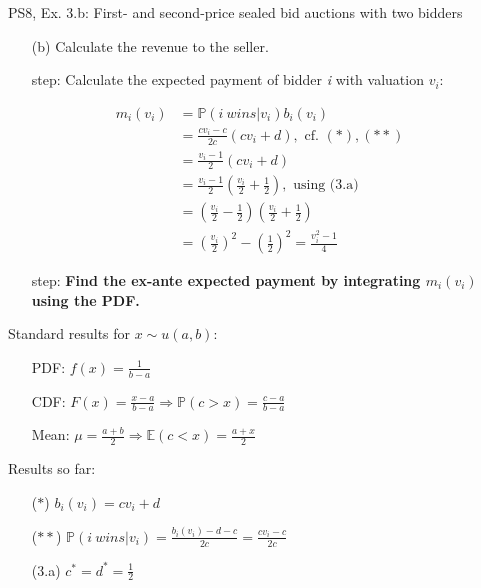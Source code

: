 \begin{frame}{PS8, Ex. 3.b: First- and second-price sealed bid auctions with two bidders}
    \begin{multicols}{2}
      \begin{itemize}
        \item[(b)] Calculate the revenue to the seller.
        \item[\nth{1} step:] Calculate the expected payment of bidder \textit{i} with valuation $v_i$:
      \end{itemize}
      \vspace{-6pt}
      \begin{align*}
        m_i(v_i)&=\mathbb{P}(i\ wins|v_i)b_i(v_i)\\
                &=\frac{cv_i-c}{2c}(cv_i+d),\text{ cf. }(*),(**)\\
                &=\frac{v_i-1}{2}(cv_i+d)\\
                &=\frac{v_i-1}{2}\left(\frac{v_i}{2}+\frac{1}{2}\right),\text{ using (3.a)}\\
                &=\left(\frac{v_i}{2}-\frac{1}{2}\right)\left(\frac{v_i}{2}+\frac{1}{2}\right)\\
                &=\left(\frac{v_i}{2}\right)^2-\left(\frac{1}{2}\right)^2
                 =\frac{v_i^2-1}{4}
      \end{align*}
      \vspace{-12pt}
      \begin{itemize}
        \item[\nth{2} step:] \textbf{Find the ex-ante expected payment by integrating $m_i(v_i)$ using the PDF.}
      \end{itemize}
      \vfill\null\columnbreak
      Standard results for $x\sim u(a, b):$
      \vspace{-6pt}
      \begin{enumerate}
        \item[PDF:] $f(x)=\frac{1}{b-a}$
        \item[CDF:] $F(x)=\frac{x-a}{b-a}\Rightarrow\mathbb{P}(c>x)=\frac{c-a}{b-a}$
        \item[Mean:] $\mu=\frac{a+b}{2}\Rightarrow\mathbb{E}(c<x)=\frac{a+x}{2}$
      \end{enumerate}
      \vspace{-6pt}
      Results so far:
      \vspace{-6pt}
      \begin{itemize}
        \item[($*$)]  $b_i(v_i) = cv_i+d$
        \item[($**$)] $\mathbb{P}(i\ wins|v_i)=\frac{b_i(v_i)-d-c}{2c}=\frac{cv_i-c}{2c}$
        \item[(3.a)]    $c^*=d^*=\frac{1}{2}$
      \end{itemize}
      \vfill\null
    \end{multicols}
\end{frame}
